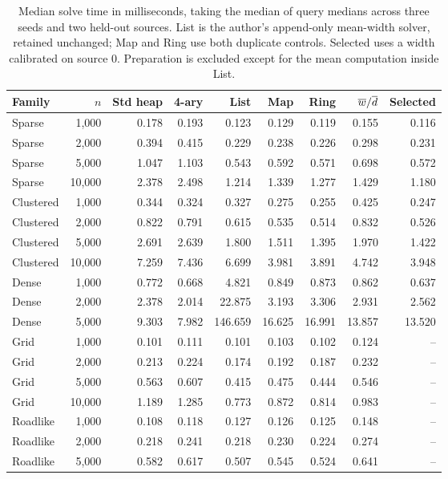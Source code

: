 \begin{table}[tb]\centering\small\setlength{\tabcolsep}{3.5pt}
\caption{Median solve time in milliseconds, taking the median of query medians across three seeds and two held-out sources. List is the author's append-only mean-width solver, retained unchanged; Map and Ring use both duplicate controls. Selected uses a width calibrated on source 0. Preparation is excluded except for the mean computation inside List.}
\begin{tabular}{lrrrrrrrr}
\toprule
Family & $n$ & Std heap & 4-ary & List & Map & Ring & $\overline{w}/\overline{d}$ & Selected \\ \midrule
Sparse & 1,000 & 0.178 & 0.193 & 0.123 & 0.129 & 0.119 & 0.155 & 0.116 \\
Sparse & 2,000 & 0.394 & 0.415 & 0.229 & 0.238 & 0.226 & 0.298 & 0.231 \\
Sparse & 5,000 & 1.047 & 1.103 & 0.543 & 0.592 & 0.571 & 0.698 & 0.572 \\
Sparse & 10,000 & 2.378 & 2.498 & 1.214 & 1.339 & 1.277 & 1.429 & 1.180 \\
Clustered & 1,000 & 0.344 & 0.324 & 0.327 & 0.275 & 0.255 & 0.425 & 0.247 \\
Clustered & 2,000 & 0.822 & 0.791 & 0.615 & 0.535 & 0.514 & 0.832 & 0.526 \\
Clustered & 5,000 & 2.691 & 2.639 & 1.800 & 1.511 & 1.395 & 1.970 & 1.422 \\
Clustered & 10,000 & 7.259 & 7.436 & 6.699 & 3.981 & 3.891 & 4.742 & 3.948 \\
Dense & 1,000 & 0.772 & 0.668 & 4.821 & 0.849 & 0.873 & 0.862 & 0.637 \\
Dense & 2,000 & 2.378 & 2.014 & 22.875 & 3.193 & 3.306 & 2.931 & 2.562 \\
Dense & 5,000 & 9.303 & 7.982 & 146.659 & 16.625 & 16.991 & 13.857 & 13.520 \\
Grid & 1,000 & 0.101 & 0.111 & 0.101 & 0.103 & 0.102 & 0.124 & -- \\
Grid & 2,000 & 0.213 & 0.224 & 0.174 & 0.192 & 0.187 & 0.232 & -- \\
Grid & 5,000 & 0.563 & 0.607 & 0.415 & 0.475 & 0.444 & 0.546 & -- \\
Grid & 10,000 & 1.189 & 1.285 & 0.773 & 0.872 & 0.814 & 0.983 & -- \\
Roadlike & 1,000 & 0.108 & 0.118 & 0.127 & 0.126 & 0.125 & 0.148 & -- \\
Roadlike & 2,000 & 0.218 & 0.241 & 0.218 & 0.230 & 0.224 & 0.274 & -- \\
Roadlike & 5,000 & 0.582 & 0.617 & 0.507 & 0.545 & 0.524 & 0.641 & -- \\
\bottomrule\end{tabular}\end{table}
